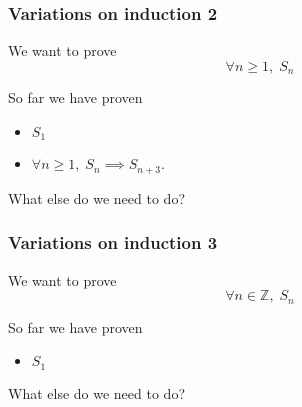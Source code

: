 \documentclass[14pt]{beamer}
\begin{document}

	\begin{frame}
		\frametitle{Variations on induction 2}

		We want to prove
		\[
			\forall n \geq 1, \; S_{n}
		\]

		\vfill

		So far we have proven
		\begin{itemize}
			\item $S_{1}$

			\item $\displaystyle \forall n \geq 1, \; S_{n}\implies S_{n+3}.$
		\end{itemize}

		\vfill

		What else do we need to do?
	\end{frame}


	\begin{frame}
		\frametitle{Variations on induction 3}

		We want to prove
		\[
			\forall n \in \mathbb{Z}, \; S_{n}
		\]

		\vfill

		So far we have proven
		\begin{itemize}
			\item $S_{1}$
		\end{itemize}

		\vfill

		What else do we need to do?
	\end{frame}

\end{document}
